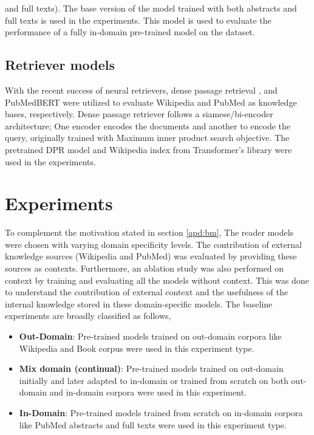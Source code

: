 \documentclass[pmlr,twocolumn,10pt]{jmlr}
\begin{document}
\noindent and full texts). The base version of the model trained with both abstracts and full texts is used in the experiments. This model is used to evaluate the performance of a fully in-domain pre-trained model on the dataset.
\subsection{Retriever models}
With the recent success of neural retrievers, dense passage retrieval \citep{karpukhin2020dense}, and PubMedBERT\citep{Gu2020} were utilized to evaluate Wikipedia and PubMed as knowledge bases, respectively. Dense passage retriever follows a siamese/bi-encoder architecture; One encoder encodes the documents and another to encode the query, originally trained with Maximum inner product search objective. The pretrained DPR model and Wikipedia index from Transformer's library \citep{Wolf2020} were used in the experiments.
\section{Experiments}
\label{apd:exp}
To complement the motivation stated in section \ref{apd:bm}, The reader models were chosen with varying domain specificity levels. The contribution of external knowledge sources (Wikipedia and PubMed) was evaluated by providing these sources as contexts. Furthermore, an ablation study was also performed on context by training and evaluating all the models without context. This was done to understand the contribution of external context and the usefulness of the internal knowledge stored in these domain-specific models. The baseline experiments are broadly classified as follows,


\begin{itemize}
    
    \item \textbf{Out-Domain}:
    Pre-trained models trained on out-domain corpora like Wikipedia and Book corpus were used in this experiment type.
    
    \item \textbf{Mix domain (continual)}:
     Pre-trained models trained on out-domain initially and later adapted to in-domain or trained from scratch on both out-domain and in-domain corpora were used in this experiment.
     
    \item \textbf{In-Domain}:
    Pre-trained models trained from scratch on in-domain corpora like PubMed abstracts and full texts were used in this experiment type.
    
\end{itemize}
\end{document}
